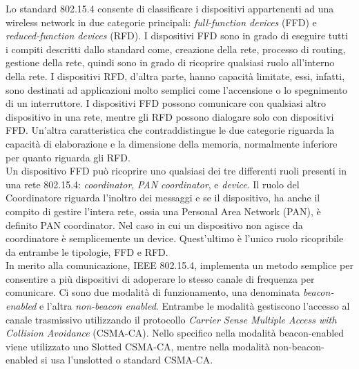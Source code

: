 \noindent Lo standard 802.15.4 consente di classificare i dispositivi appartenenti ad una wireless network in due categorie principali: \textit{full-function devices} (FFD) e \textit{reduced-function devices} (RFD). I dispositivi FFD sono in grado di eseguire tutti i compiti descritti dallo standard come, creazione della rete, processo di routing, gestione della rete, quindi sono in grado di ricoprire qualsiasi ruolo all'interno della rete. I dispositivi RFD, d'altra parte, hanno capacità limitate, essi, infatti, sono destinati ad applicazioni molto semplici come l'accensione o lo spegnimento di un interruttore. I dispositivi FFD possono comunicare con qualsiasi altro dispositivo in una rete, mentre gli RFD possono dialogare solo con dispositivi FFD. Un'altra caratteristica che contraddistingue le due categorie riguarda la capacità di elaborazione e la dimensione della memoria, normalmente inferiore per quanto riguarda gli RFD.\\
Un dispositivo FFD può ricoprire uno qualsiasi dei tre differenti ruoli presenti in una rete 802.15.4: \textit{coordinator}, \textit{PAN coordinator}, e \textit{device}. Il ruolo del Coordinatore riguarda l'inoltro dei messaggi e se il dispositivo, ha anche il compito di gestire l'intera rete, ossia una Personal Area Network (PAN), è definito PAN coordinator. Nel caso in cui un dispositivo non agisce da coordinatore è semplicemente un device. Quest'ultimo è l'unico ruolo ricopribile da entrambe le tipologie, FFD e RFD.\\

\noindent In merito alla comunicazione, IEEE 802.15.4, implementa un metodo semplice per consentire a più dispositivi di adoperare lo stesso canale di frequenza per comunicare. Ci sono due modalità di funzionamento, una denominata \textit{beacon-enabled} e l'altra \textit{non-beacon enabled}. Entrambe le modalità gestiscono l'accesso al canale trasmissivo utilizzando il protocollo \textit{Carrier Sense Multiple Access with Collision Avoidance} (CSMA-CA). Nello specifico nella modalità beacon-enabled viene utilizzato uno Slotted CSMA-CA, mentre nella modalità non-beacon-enabled si usa l'unslotted o standard CSMA-CA.\\


